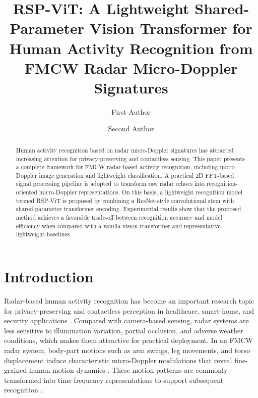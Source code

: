 \documentclass{svproc}
\begin{document}
\mainmatter

\title{RSP-ViT: A Lightweight Shared-Parameter Vision Transformer for Human Activity Recognition from FMCW Radar Micro-Doppler Signatures}
\author{First Author \and Second Author}
\maketitle

\begin{abstract}
Human activity recognition based on radar micro-Doppler signatures has attracted increasing attention for privacy-preserving and contactless sensing. This paper presents a complete framework for FMCW radar-based activity recognition, including micro-Doppler image generation and lightweight classification. A practical 2D FFT-based signal processing pipeline is adopted to transform raw radar echoes into recognition-oriented micro-Doppler representations. On this basis, a lightweight recognition model termed RSP-ViT is proposed by combining a ResNet-style convolutional stem with shared-parameter transformer encoding. Experimental results show that the proposed method achieves a favorable trade-off between recognition accuracy and model efficiency when compared with a vanilla vision transformer and representative lightweight baselines.
\end{abstract}

\section{Introduction}

Radar-based human activity recognition has become an important research topic for privacy-preserving and contactless perception in healthcare, smart-home, and security applications \cite{Vandersmissen2018}. Compared with camera-based sensing, radar systems are less sensitive to illumination variation, partial occlusion, and adverse weather conditions, which makes them attractive for practical deployment. In an FMCW radar system, body-part motions such as arm swings, leg movements, and torso displacement induce characteristic micro-Doppler modulations that reveal fine-grained human motion dynamics \cite{Chen2006}. These motion patterns are commonly transformed into time-frequency representations to support subsequent recognition \cite{Harmanny2014}.
\end{document}

